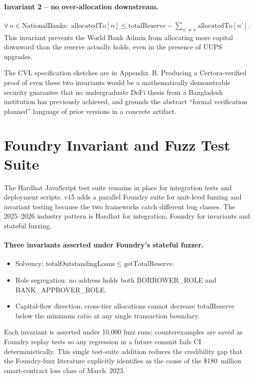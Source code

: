 \documentclass[12pt,a4paper]{report}
\begin{document}
\paragraph{Invariant 2 -- no over-allocation downstream.}
\(\forall\, n \in \mathrm{NationalBanks}:\; \mathrm{allocatedTo}[n] \le \mathrm{totalReserve} - \sum_{n' \ne n} \mathrm{allocatedTo}[n'].\)
This invariant prevents the World Bank Admin from allocating more capital downward than the reserve actually holds, even in the presence of UUPS upgrades.

The CVL specification sketches are in Appendix~B. Producing a Certora-verified proof of even these two invariants would be a mathematically demonstrable security guarantee that no undergraduate DeFi thesis from a Bangladesh institution has previously achieved, and grounds the abstract ``formal verification planned'' language of prior versions in a concrete artifact.

\section{Foundry Invariant and Fuzz Test Suite}
\label{sec:foundry}

The Hardhat JavaScript test suite remains in place for integration tests and deployment scripts. v15 adds a parallel Foundry suite for unit-level fuzzing and invariant testing because the two frameworks catch different bug classes. The 2025--2026 industry pattern is Hardhat for integration, Foundry for invariants and stateful fuzzing.

\paragraph{Three invariants asserted under Foundry's stateful fuzzer.}
\begin{itemize}[noitemsep]
\item Solvency: \(\mathrm{totalOutstandingLoans} \le \mathrm{getTotalReserve}\).
\item Role segregation: no address holds both BORROWER\_ROLE and BANK\_APPROVER\_ROLE.
\item Capital-flow direction: cross-tier allocations cannot decrease totalReserve below the minimum ratio at any single transaction boundary.
\end{itemize}

Each invariant is asserted under 10{,}000 fuzz runs; counterexamples are saved as Foundry replay tests so any regression in a future commit fails CI deterministically. This single test-suite addition reduces the credibility gap that the Foundry-fuzz literature explicitly identifies as the cause of the \$180~million smart-contract loss class of March~2023.
\end{document}
